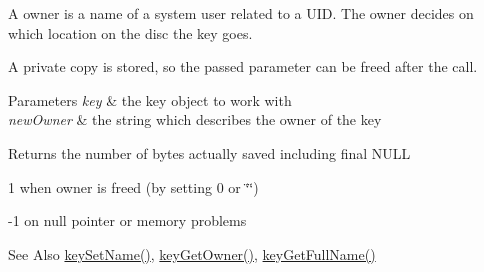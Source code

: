 A owner is a name of a system user related to a U\-I\-D. The owner decides on which location on the disc the key goes.

A private copy is stored, so the passed parameter can be freed after the call.


\begin{DoxyParams}{Parameters}
{\em key} & the key object to work with \\
\hline
{\em new\-Owner} & the string which describes the owner of the key \\
\hline
\end{DoxyParams}
\begin{DoxyReturn}{Returns}
the number of bytes actually saved including final N\-U\-L\-L 

1 when owner is freed (by setting 0 or \char`\"{}\char`\"{}) 

-\/1 on null pointer or memory problems 
\end{DoxyReturn}
\begin{DoxySeeAlso}{See Also}
\hyperlink{group__keyname_ga7699091610e7f3f43d2949514a4b35d9}{key\-Set\-Name()}, \hyperlink{group__keyname_ga35922a017bee8b4bcb493bbdfad9d6f5}{key\-Get\-Owner()}, \hyperlink{group__keyname_gaaba1494a5ffc976e0e56c43f4334a23c}{key\-Get\-Full\-Name()} 
\end{DoxySeeAlso}
